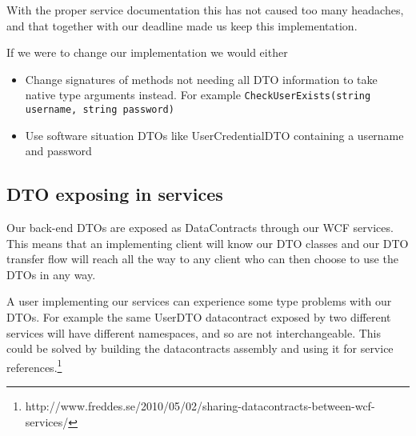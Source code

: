 \documentclass[../report.tex]{subfiles}
\begin{document}
With the proper service documentation this has not caused too many headaches, and that together with our deadline made us keep this implementation.

If we were to change our implementation we would either

\begin{itemize}
\item Change signatures of methods not needing all DTO information to take native type arguments instead. For example \texttt{CheckUserExists(string username, string password)}
\item Use software situation DTOs like UserCredentialDTO containing a username and password
\end{itemize}


\subsection{DTO exposing in services}

Our back-end DTOs are exposed as DataContracts through our WCF services. This means that an implementing client will know our DTO classes and our DTO transfer flow will reach all the way to any client who can then choose to use the DTOs in any way.

A user implementing our services can experience some type problems with our DTOs. For example the same UserDTO datacontract exposed by two different services will have different namespaces, and so are not interchangeable. This could be solved by building the datacontracts assembly and using it for service references.\footnote{http://www.freddes.se/2010/05/02/sharing-datacontracts-between-wcf-services/} 
\end{document}
